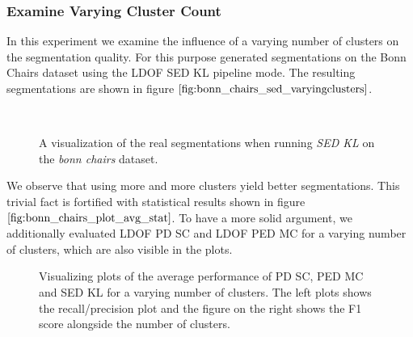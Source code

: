 \subsubsection{Examine Varying Cluster Count}
In this experiment we examine the influence of a varying number of clusters on the segmentation quality. For this purpose generated segmentations on the Bonn Chairs dataset using the LDOF SED KL pipeline mode. The resulting segmentations are shown in figure $\ref{fig:bonn_chairs_sed_varyingclusters}$.
\begin{figure}[H]
\begin{center}
~
~
\end{center}
\caption[Bonn Chairs SED Segmentations for Varying Cluster Count]{A visualization of the real segmentations when running \textit{SED KL} on the \textit{bonn chairs} dataset.}
\label{fig:bonn_chairs_sed_varyingclusters}
\end{figure}
We observe that using more and more clusters yield better segmentations. This trivial fact is fortified with statistical results shown in figure $\ref{fig:bonn_chairs_plot_avg_stat}$. To have a more solid argument, we additionally evaluated LDOF PD SC and LDOF PED MC for a varying number of clusters, which are also visible in the plots.
\begin{figure}[H]
\begin{center}
\end{center}
\caption[Bonn Chairs Varying Clusters]{Visualizing plots of the average performance of PD SC, PED MC and SED KL for a varying number of clusters. The left plots shows the recall/precision plot and the figure on the right shows the F1 score alongside the number of clusters.}
\label{fig:bonn_chairs_plot_avg_stat}
\end{figure}

